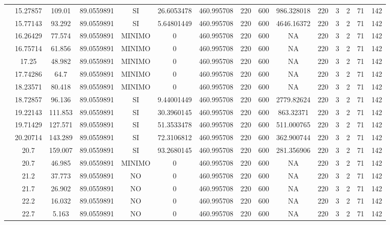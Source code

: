 \begin{table}[H]
{\begin{tabular}{|c|c|c|c|c|c|c|c|c|c|c|c|c|c|c|}
\cline{2-15}    & 15.27857 & 109.01 & 89.0559891 & SI  & 26.6053478 & 460.995708 & 220 & 600 & 986.328018 & 220 & 3   & 2   & 71  & 142 \bigstrut\\
\cline{2-15}    & 15.77143 & 93.292 & 89.0559891 & SI  & 5.64801449 & 460.995708 & 220 & 600 & 4646.16372 & 220 & 3   & 2   & 71  & 142 \bigstrut\\
\cline{2-15}    & 16.26429 & 77.574 & 89.0559891 & MINIMO & 0   & 460.995708 & 220 & 600 & NA  & 220 & 3   & 2   & 71  & 142 \bigstrut\\
\cline{2-15}    & 16.75714 & 61.856 & 89.0559891 & MINIMO & 0   & 460.995708 & 220 & 600 & NA  & 220 & 3   & 2   & 71  & 142 \bigstrut\\
\cline{2-15}    & 17.25 & 48.982 & 89.0559891 & MINIMO & 0   & 460.995708 & 220 & 600 & NA  & 220 & 3   & 2   & 71  & 142 \bigstrut\\
\cline{2-15}    & 17.74286 & 64.7 & 89.0559891 & MINIMO & 0   & 460.995708 & 220 & 600 & NA  & 220 & 3   & 2   & 71  & 142 \bigstrut\\
\cline{2-15}    & 18.23571 & 80.418 & 89.0559891 & MINIMO & 0   & 460.995708 & 220 & 600 & NA  & 220 & 3   & 2   & 71  & 142 \bigstrut\\
\cline{2-15}    & 18.72857 & 96.136 & 89.0559891 & SI  & 9.44001449 & 460.995708 & 220 & 600 & 2779.82624 & 220 & 3   & 2   & 71  & 142 \bigstrut\\
\cline{2-15}    & 19.22143 & 111.853 & 89.0559891 & SI  & 30.3960145 & 460.995708 & 220 & 600 & 863.32371 & 220 & 3   & 2   & 71  & 142 \bigstrut\\
\cline{2-15}    & 19.71429 & 127.571 & 89.0559891 & SI  & 51.3533478 & 460.995708 & 220 & 600 & 511.000765 & 220 & 3   & 2   & 71  & 142 \bigstrut\\
\cline{2-15}    & 20.20714 & 143.289 & 89.0559891 & SI  & 72.3106812 & 460.995708 & 220 & 600 & 362.900744 & 220 & 3   & 2   & 71  & 142 \bigstrut\\
\cline{2-15}    & 20.7 & 159.007 & 89.0559891 & SI  & 93.2680145 & 460.995708 & 220 & 600 & 281.356906 & 220 & 3   & 2   & 71  & 142 \bigstrut\\
\cline{2-15}    & 20.7 & 46.985 & 89.0559891 & MINIMO & 0   & 460.995708 & 220 & 600 & NA  & 220 & 3   & 2   & 71  & 142 \bigstrut\\
\cline{2-15}    & 21.2 & 37.773 & 89.0559891 & NO  & 0   & 460.995708 & 220 & 600 & NA  & 220 & 3   & 2   & 71  & 142 \bigstrut\\
\cline{2-15}    & 21.7 & 26.902 & 89.0559891 & NO  & 0   & 460.995708 & 220 & 600 & NA  & 220 & 3   & 2   & 71  & 142 \bigstrut\\
\cline{2-15}    & 22.2 & 16.032 & 89.0559891 & NO  & 0   & 460.995708 & 220 & 600 & NA  & 220 & 3   & 2   & 71  & 142 \bigstrut\\
\cline{2-15}    & 22.7 & 5.163 & 89.0559891 & NO  & 0   & 460.995708 & 220 & 600 & NA  & 220 & 3   & 2   & 71  & 142 \bigstrut\\
\hline
\end{tabular}%


}
\end{table}
